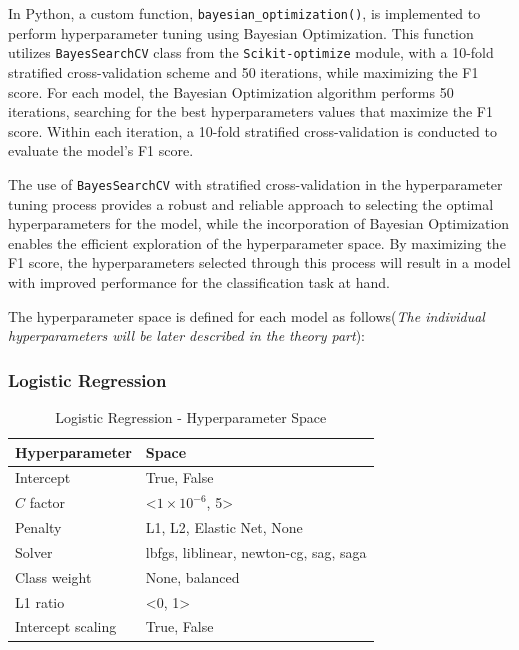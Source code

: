 In Python, a custom function, \lstinline{bayesian_optimization()}, is implemented to perform hyperparameter tuning using Bayesian Optimization.
This function utilizes \lstinline{BayesSearchCV} class from the \lstinline{Scikit-optimize} module, with a 10-fold stratified cross-validation scheme and 50 iterations, while maximizing the F1 score.
For each model, the Bayesian Optimization algorithm performs 50 iterations, searching for the best hyperparameters values that maximize the F1 score. Within each iteration, a 10-fold stratified cross-validation is conducted to evaluate the model's F1 score.

The use of \lstinline{BayesSearchCV} with stratified cross-validation in the hyperparameter tuning process provides a robust and reliable approach to selecting the optimal hyperparameters for the model, while the incorporation of Bayesian Optimization enables the efficient exploration of the hyperparameter space.
By maximizing the F1 score, the hyperparameters selected through this process will result in a model with improved performance for the classification task at hand.

The hyperparameter space is defined for each model as follows(\textit{The individual hyperparameters will be later described in the theory part}):
\subsubsection{Logistic Regression}

\begin{table}[H]
    \small
    \setlength{\tabcolsep}{8pt}
    \renewcommand{\arraystretch}{1.3}
    \centering
        \caption[Logistic Regression - Hyperparameter Space]{Logistic Regression - Hyperparameter Space}\label{tab:lrspace}
        \begin{tabular}{ll}
    \toprule
    \textbf{Hyperparameter} & \textbf{Space}\\
    \midrule
    \hline
    Intercept & True, False \\
    $C$ factor & <$1\times10^{-6}$, 5>\\
    Penalty & L1, L2, Elastic Net, None \\
    Solver & lbfgs, liblinear, newton-cg, sag, saga \\
    Class weight & None, balanced \\
    L1 ratio & <0, 1> \\
    Intercept scaling & True, False  \\
    \hline
    \bottomrule
    \end{tabular}
    \vspace{0.7em}

    \vspace{-1em}
\end{table}



